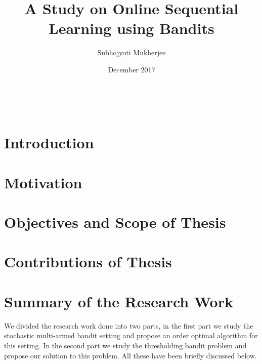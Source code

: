 \documentclass[MS,synopsis]{iitmdiss}
\title{A Study on Online Sequential Learning using Bandits}
\author{Subhojyoti Mukherjee}
\date{December 2017}
\begin{document}
\maketitle

\newpage
\
\thispagestyle{empty}
\clearpage

\setcounter{page}{1}



\section{Introduction}
\label{synopsis:intro}


\section{Motivation}
\label{synopsis:motivation}


\section{Objectives and Scope of Thesis}
\label{synopsis:objThesis}


\section{Contributions of Thesis}
\label{synopsis:contriThesis}


%
%

\section{Summary of the Research Work}

We divided the research work done into two parts, in the first part we study the stochastic multi-armed bandit setting and propose an order optimal algorithm for this setting. In the second part we study the thresholding bandit problem and propose our solution to this problem. All these have been briefly discussed below.

\end{document}
